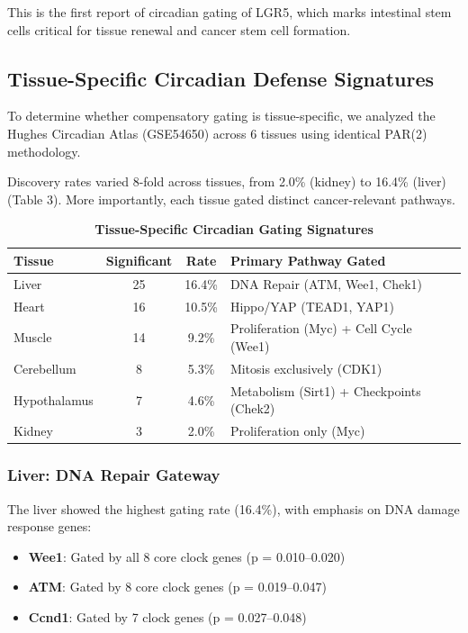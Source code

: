 \documentclass[11pt,letterpaper]{article}
\begin{document}
This is the first report of circadian gating of LGR5, which marks intestinal stem cells critical for tissue renewal and cancer stem cell formation.

\subsection{Tissue-Specific Circadian Defense Signatures}

To determine whether compensatory gating is tissue-specific, we analyzed the Hughes Circadian Atlas (GSE54650) across 6 tissues using identical PAR(2) methodology.

Discovery rates varied 8-fold across tissues, from 2.0\% (kidney) to 16.4\% (liver) (Table 3). More importantly, each tissue gated distinct cancer-relevant pathways.

\begin{table}[H]
\centering
\caption{\textbf{Tissue-Specific Circadian Gating Signatures}}
\begin{tabular}{lccp{5cm}}
\toprule
\textbf{Tissue} & \textbf{Significant} & \textbf{Rate} & \textbf{Primary Pathway Gated} \\
\midrule
Liver & 25 & 16.4\% & DNA Repair (ATM, Wee1, Chek1) \\
Heart & 16 & 10.5\% & Hippo/YAP (TEAD1, YAP1) \\
Muscle & 14 & 9.2\% & Proliferation (Myc) + Cell Cycle (Wee1) \\
Cerebellum & 8 & 5.3\% & Mitosis exclusively (CDK1) \\
Hypothalamus & 7 & 4.6\% & Metabolism (Sirt1) + Checkpoints (Chek2) \\
Kidney & 3 & 2.0\% & Proliferation only (Myc) \\
\bottomrule
\end{tabular}
\label{tab:tissues}
\end{table}

\subsubsection{Liver: DNA Repair Gateway}

The liver showed the highest gating rate (16.4\%), with emphasis on DNA damage response genes:
\begin{itemize}
    \item \textbf{Wee1}: Gated by all 8 core clock genes (p = 0.010--0.020)
    \item \textbf{ATM}: Gated by 8 core clock genes (p = 0.019--0.047)
    \item \textbf{Ccnd1}: Gated by 7 clock genes (p = 0.027--0.048)
\end{itemize}
\end{document}
